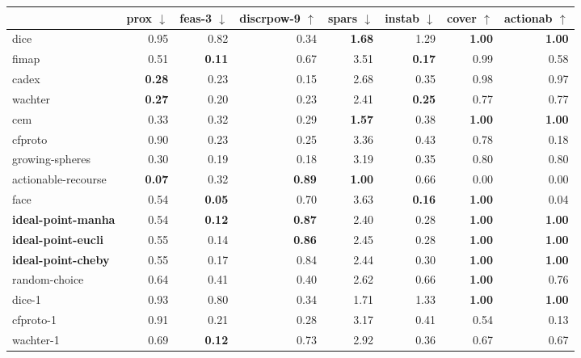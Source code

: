 \begin{tabular}{lrrrrrrr} \hline
 & prox $\downarrow$& feas-3 $\downarrow$& discrpow-9 $\uparrow$& spars $\downarrow$& instab $\downarrow$& cover $\uparrow$& actionab $\uparrow$\\ \hline
dice & 0.95 & 0.82 & 0.34 & \bfseries 1.68 & 1.29 & \bfseries 1.00 & \bfseries 1.00 \\ \hline
fimap & 0.51 & \bfseries 0.11 & 0.67 & 3.51 & \bfseries 0.17 & 0.99 & 0.58 \\ \hline
cadex & \bfseries 0.28 & 0.23 & 0.15 & 2.68 & 0.35 & 0.98 & 0.97 \\ \hline
wachter & \bfseries 0.27 & 0.20 & 0.23 & 2.41 & \bfseries 0.25 & 0.77 & 0.77 \\ \hline
cem & 0.33 & 0.32 & 0.29 & \bfseries 1.57 & 0.38 & \bfseries 1.00 & \bfseries 1.00 \\ \hline
cfproto & 0.90 & 0.23 & 0.25 & 3.36 & 0.43 & 0.78 & 0.18 \\ \hline
growing-spheres & 0.30 & 0.19 & 0.18 & 3.19 & 0.35 & 0.80 & 0.80 \\ \hline
actionable-recourse & \bfseries 0.07 & 0.32 & \bfseries 0.89 & \bfseries 1.00 & 0.66 & 0.00 & 0.00 \\ \hline
face & 0.54 & \bfseries 0.05 & 0.70 & 3.63 & \bfseries 0.16 & \bfseries 1.00 & 0.04 \\ \hline
\bfseries ideal-point-manha & 0.54 & \bfseries 0.12 & \bfseries 0.87 & 2.40 & 0.28 & \bfseries 1.00 & \bfseries 1.00 \\ \hline
\bfseries ideal-point-eucli & 0.55 & 0.14 & \bfseries 0.86 & 2.45 & 0.28 & \bfseries 1.00 & \bfseries 1.00 \\ \hline
\bfseries ideal-point-cheby & 0.55 & 0.17 & 0.84 & 2.44 & 0.30 & \bfseries 1.00 & \bfseries 1.00 \\ \hline
random-choice & 0.64 & 0.41 & 0.40 & 2.62 & 0.66 & \bfseries 1.00 & 0.76 \\ \hline
dice-1 & 0.93 & 0.80 & 0.34 & 1.71 & 1.33 & \bfseries 1.00 & \bfseries 1.00 \\ \hline
cfproto-1 & 0.91 & 0.21 & 0.28 & 3.17 & 0.41 & 0.54 & 0.13 \\ \hline
wachter-1 & 0.69 & \bfseries 0.12 & 0.73 & 2.92 & 0.36 & 0.67 & 0.67 \\ \hline
\end{tabular}
